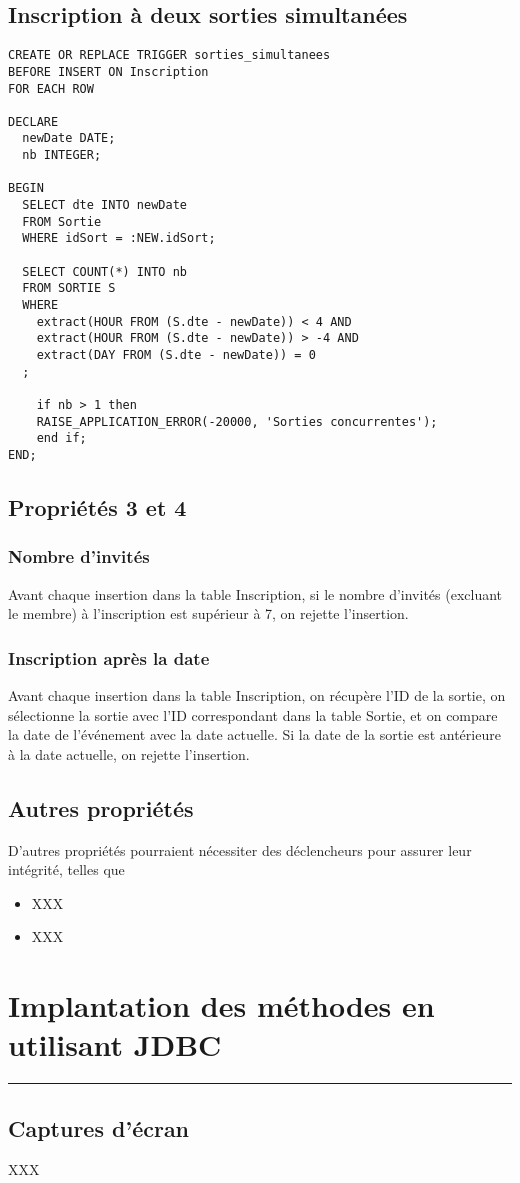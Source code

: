 \documentclass[11pt,letterpaper]{article}
\begin{document}
\subsection{Inscription à deux sorties simultanées}
\begin{lstlisting}[style=sql, label={lst:p4}]
CREATE OR REPLACE TRIGGER sorties_simultanees
BEFORE INSERT ON Inscription
FOR EACH ROW

DECLARE
  newDate DATE;
  nb INTEGER;

BEGIN
  SELECT dte INTO newDate
  FROM Sortie
  WHERE idSort = :NEW.idSort;
  
  SELECT COUNT(*) INTO nb
  FROM SORTIE S
  WHERE
    extract(HOUR FROM (S.dte - newDate)) < 4 AND
    extract(HOUR FROM (S.dte - newDate)) > -4 AND
    extract(DAY FROM (S.dte - newDate)) = 0
  ;

	if nb > 1 then
	RAISE_APPLICATION_ERROR(-20000, 'Sorties concurrentes');
	end if;
END;
\end{lstlisting}


\subsection{Propriétés 3 et 4}
\subsubsection*{Nombre d’invités}
Avant chaque insertion dans la table Inscription, si le nombre d’invités (excluant le membre) à l’inscription est supérieur à 7, on rejette l’insertion.

\subsubsection*{Inscription après la date}
Avant chaque insertion dans la table Inscription, on récupère l’ID de la sortie, on sélectionne la sortie avec l’ID correspondant dans la table Sortie, et on compare la date de l’événement avec la date actuelle. Si la date de la sortie est antérieure à la date actuelle, on rejette l’insertion.


\subsection{Autres propriétés}
D'autres propriétés pourraient nécessiter des déclencheurs pour assurer leur intégrité, telles que\\
\begin{itemize}
  \item XXX
  \item XXX
\end{itemize}



\section{Implantation des méthodes en utilisant JDBC}
\hrule
\vspace{1em}
\subsection{Captures d'écran}
XXX
\end{document}
